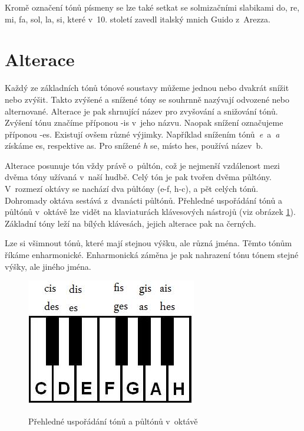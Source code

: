 Kromě označení tónů písmeny se lze také setkat se solmizačními slabikami do, re, mi, fa, sol, la, si,
které v~10. století zavedl italský mnich Guido z~Arezza.
\cite{cmiral}
\par    

\section{Alterace}
Každý ze základních tónů tónové soustavy můžeme jednou nebo dvakrát snížit nebo zvýšit.
Takto zvýšené a snížené tóny se souhrnně nazývají odvozené nebo alternované.
Alterace je pak shrnující název pro zvyšování a snižování tónů.
Zvýšení tónu značíme příponou -is v~jeho názvu.
Naopak snížení označujeme příponou -es.
Existují ovšem různé výjimky.
Například snížením tónů\emph{~e}~a\emph{~a} získáme es, respektive as.
Pro snížené \emph{h} se, místo hes, používá název~b.
\cite{zenkl}
\par

Alterace posunuje tón vždy právě o~půltón, 
což je nejmenší vzdálenost mezi dvěma tóny užívaná v~naší hudbě.
Celý tón je pak tvořen dvěma půltóny. 
V~rozmezí oktávy se nachází dva půltóny ({e-f, h-c}), a pět celých tónů.
Dohromady oktáva sestává z~dvanácti půltónů.
Přehledné uspořádání tónů a půltónů v~oktávě lze vidět na klaviaturách klávesových nástrojů (viz obrázek \ref{obrazekRozlozeniKlaviatury}).
Základní tóny leží na bílých klávesách, jejich alterace pak na černých.
\cite{zenkl,cmiral}
\par

Lze si všimnout tónů, které mají stejnou výšku, ale různá jména.
Těmto tónům říkáme enharmonické. Enharmonická záměna je pak nahrazení tónu tónem stejné výšky, ale jiného jména.\cite{zenkl}

\begin{figure}[h]\centering
    \centering
    \includegraphics[width=0.4\linewidth]{obrazky/klaviatura.jpg}\\[1pt]  
    \caption{Přehledné uspořádání tónů a půltónů v~oktávě \cite{orientaceNaKlaviature}}    
    \label{obrazekRozlozeniKlaviatury}
\end{figure}

